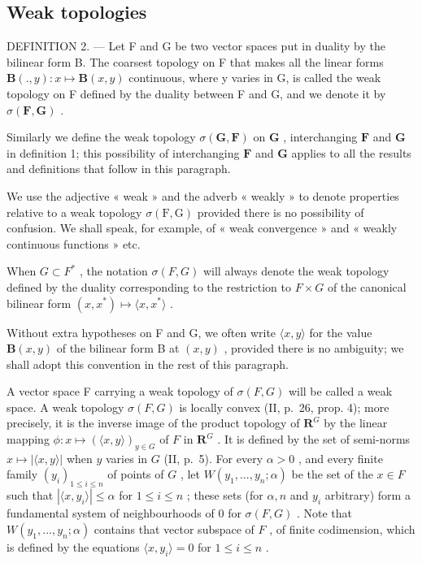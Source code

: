 \subsection{Weak topologies}

DEFINITION 2. --- Let F and G be two vector spaces put in duality by the bilinear form B. The coarsest topology on F that makes all the linear forms \(\mathbf{B}(., y): x \mapsto \mathbf{B}(x, y)\) continuous, where y varies in G, is called the weak topology on F defined by the duality between F and G, and we denote it by \(\sigma(\mathbf{F}, \mathbf{G})\) .

Similarly we define the weak topology \(\sigma(\mathbf{G},\mathbf{F})\) on \(\mathbf{G}\) , interchanging \(\mathbf{F}\) and \(\mathbf{G}\) in definition 1; this possibility of interchanging \(\mathbf{F}\) and \(\mathbf{G}\) applies to all the results and definitions that follow in this paragraph.

We use the adjective « weak » and the adverb « weakly » to denote properties relative to a weak topology \(\sigma(\mathrm{F},\mathrm{G})\) provided there is no possibility of confusion. We shall speak, for example, of « weak convergence » and « weakly continuous functions » etc.

When \(G \subset F^{*}\) , the notation \(\sigma(F, G)\) will always denote the weak topology defined by the duality corresponding to the restriction to \(F \times G\) of the canonical bilinear form \((x, x^{*}) \mapsto \langle x, x^{*} \rangle\) .

Without extra hypotheses on F and G, we often write \(\langle x, y \rangle\) for the value \(\mathbf{B}(x, y)\) of the bilinear form B at \((x, y)\) , provided there is no ambiguity; we shall adopt this convention in the rest of this paragraph.

A vector space F carrying a weak topology of \(\sigma(F, G)\) will be called a weak space. A weak topology \(\sigma(F, G)\) is locally convex (II, p.~26, prop. 4); more precisely, it is the inverse image of the product topology of \(\mathbf{R}^G\) by the linear mapping \(\phi: x \mapsto (\langle x, y \rangle)_{y \in G}\) of \(F\) in \(\mathbf{R}^G\) . It is defined by the set of semi-norms \(x \mapsto |\langle x, y \rangle|\) when \(y\) varies in \(G\) (II, p.~5). For every \(\alpha > 0\) , and every finite family \((y_i)_{1 \leq i \leq n}\) of points of \(G\) , let \(W(y_1, ..., y_n; \alpha)\) be the set of the \(x \in F\) such that \(|\langle x, y_i \rangle| \leqslant \alpha\) for \(1 \leq i \leq n\) ; these sets (for \(\alpha, n\) and \(y_i\) arbitrary) form a fundamental system of neighbourhoods of 0 for \(\sigma(F, G)\) . Note that \(W(y_1, ..., y_n; \alpha)\) contains that vector subspace of \(F\) , of finite codimension, which is defined by the equations \(\langle x, y_i \rangle = 0\) for \(1 \leq i \leq n\) .

